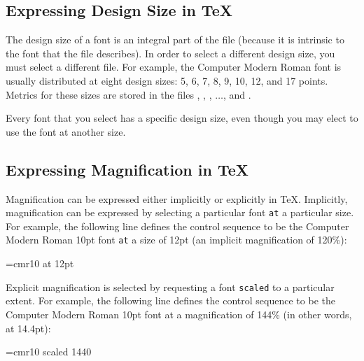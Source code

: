 
\subsection{Expressing Design Size in \protect\TeX}

The design size of 
a font is an integral part of the  file (because
it is intrinsic to the font that 
the  file describes).
In order to select a different design size, you must select a
different  file.  For example, the Computer Modern Roman font
is usually distributed at eight design sizes: 5, 6, 7, 8, 9, 10, 12,
and 17 points.  Metrics for these sizes are stored in the 
files , , ,
$\ldots$, and .

Every font that you select has a specific design size, even though you may
elect to use the font at another size.


\subsection{Expressing Magnification in \protect\TeX}

Magnification can be 
expressed either implicitly or explicitly in
\TeX.  Implicitly, magnification can be expressed by selecting a
particular font \verb|at| a particular size.  For example, the
following line defines the control sequence  to be the
Computer Modern Roman 10pt font \verb|at| a size of 12pt (an implicit
magnification of 120\%):

\begin{shortexample}
\font\big=cmr10 at 12pt
\end{shortexample}

Explicit magnification is selected by requesting a font
\verb|scaled| to a particular extent.  For example, the following
line defines the control sequence  to be the Computer
Modern Roman 10pt font at a magnification of 144\% (in other words,
at 14.4pt):

\begin{shortexample}
\font\bigger=cmr10 scaled 1440
\end{shortexample}

